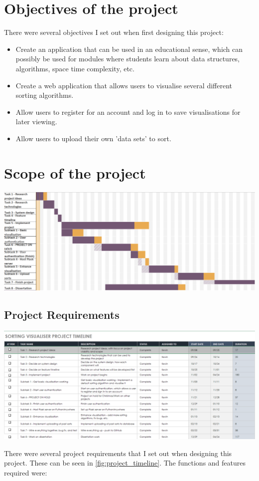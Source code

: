 \newpage
\section{Objectives of the project}
There were several objectives I set out when first designing this project:

\begin{itemize}
    \item Create an application that can be used in an educational sense, which 
    can possibly be used for modules where students learn about data structures, 
    algorithms, space time complexity, etc.
    \item Create a web application that allows users to visualise several 
    different sorting algorithms.
    \item Allow users to register for an account and log in to save
    visualisations for later viewing.
    \item Allow users to upload their own 'data sets' to sort.
\end{itemize}

\section{Scope of the project}
\begin{center}
    \includegraphics[scale=.3]{images/project_timeline} 
    \label{fig:project_timeline}
\end{center}

\subsection{Project Requirements}
\begin{center}
    \includegraphics[width=16cm]{images/project_plan} 
    \label{fig:project_plan}
\end{center}
There were several project requirements that I set out when designing this
project. These can be seen in \ref{fig:project_timeline}. The functions and
features required were:

